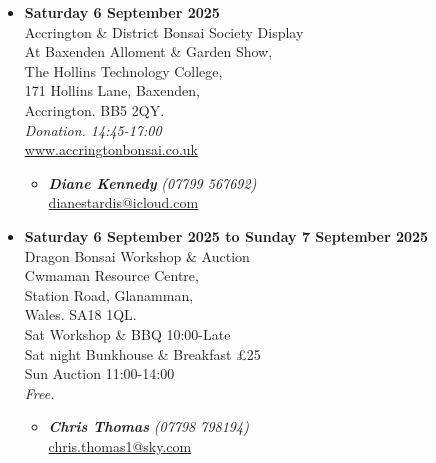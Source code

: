 \begin{itemize}
    \item \textbf{Saturday 6 September 2025}
    \\
    Accrington \& District Bonsai Society Display \\
    At Baxenden Alloment \& Garden Show, \\
    The Hollins Technology College, \\
    171 Hollins Lane, Baxenden, \\
    Accrington. BB5 2QY.
    \\
    \emph{Donation. 14:45-17:00}
    \\
    \href{https://www.accringtonbonsai.co.uk}{www.accringtonbonsai.co.uk}
    \begin{itemize}
        \item \textbf{\emph{Diane Kennedy}} \emph{(07799 567692)} \\
        \href{mailto:dianestardis@icloud.com}{dianestardis@icloud.com} 
    \end{itemize}

    \item \textbf{Saturday 6 September 2025 to Sunday 7 September 2025}
    \\
    Dragon Bonsai Workshop \& Auction \\
    Cwmaman Resource Centre, \\
    Station Road, Glanamman, \\
    Wales. SA18 1QL. \\
    Sat Workshop \& BBQ 10:00-Late \\
    Sat night Bunkhouse \& Breakfast £25 \\
    Sun Auction 11:00-14:00
    \\
    \emph{Free.}
    \begin{itemize}
        \item \textbf{\emph{Chris Thomas}} \emph{(07798 798194)} \\
        \href{mailto:chris.thomas1@sky.com}{chris.thomas1@sky.com} 
    \end{itemize}


\end{itemize}

